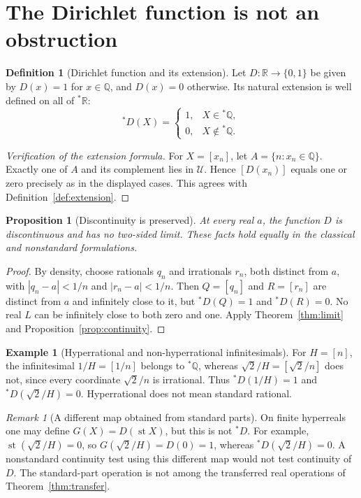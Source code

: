 \documentclass[11pt]{article}
\newtheorem{proposition}[theorem]{Proposition}
\theoremstyle{definition}
\newtheorem{definition}[theorem]{Definition}
\newtheorem{example}[theorem]{Example}
\theoremstyle{remark}
\newtheorem{remark}[theorem]{Remark}
\newcommand{\RR}{\mathbb R}
\newcommand{\QQ}{\mathbb Q}
\newcommand{\HR}{{}^{*}\mathbb R}
\newcommand{\ext}[1]{{}^{*}\!#1}
\newcommand{\U}{\mathcal U}
\DeclareMathOperator{\st}{st}
\begin{document}
\section{The Dirichlet function is not an obstruction}
\begin{definition}[Dirichlet function and its extension]\label{def:dirichlet}
Let \(D:\RR\to\{0,1\}\) be given by \(D(x)=1\) for \(x\in\QQ\), and
\(D(x)=0\) otherwise. Its natural extension is well defined on all of \(\HR\):
\[
\ext D(X)=
\begin{cases}1,&X\in\ext\QQ,\\0,&X\notin\ext\QQ.\end{cases}
\]
\end{definition}
\begin{proof}[Verification of the extension formula]
For \(X=[x_n]\), let \(A=\{n:x_n\in\QQ\}\). Exactly one of \(A\) and its
complement lies in \(\U\). Hence \([D(x_n)]\) equals one or zero precisely
as in the displayed cases. This agrees with Definition~\ref{def:extension}.
\end{proof}
\begin{proposition}[Discontinuity is preserved]\label{prop:dirichlet}
At every real \(a\), the function \(D\) is discontinuous and has no two-sided
limit. These facts hold equally in the classical and nonstandard formulations.
\end{proposition}
\begin{proof}
By density, choose rationals \(q_n\) and irrationals \(r_n\), both distinct
from \(a\), with \(|q_n-a|<1/n\) and \(|r_n-a|<1/n\).
Then \(Q=[q_n]\) and \(R=[r_n]\) are distinct from \(a\) and infinitely close
to it, but \(\ext D(Q)=1\) and \(\ext D(R)=0\).
No real \(L\) can be infinitely close to both zero and one. Apply
Theorem~\ref{thm:limit} and Proposition~\ref{prop:continuity}.
\end{proof}
\begin{example}[Hyperrational and non-hyperrational infinitesimals]\label{ex:hyperrational}
For \(H=[n]\), the infinitesimal \(1/H=[1/n]\) belongs to \(\ext\QQ\), whereas
\(\sqrt2/H=[\sqrt2/n]\) does not, since every coordinate \(\sqrt2/n\) is
irrational. Thus \(\ext D(1/H)=1\) and \(\ext D(\sqrt2/H)=0\).
Hyperrational does not mean standard rational.
\end{example}
\begin{remark}[A different map obtained from standard parts]\label{rem:wrong-extension}
On finite hyperreals one may define \(G(X)=D(\st X)\), but this is not
\(\ext D\). For example, \(\st(\sqrt2/H)=0\), so \(G(\sqrt2/H)=D(0)=1\),
whereas \(\ext D(\sqrt2/H)=0\).
A nonstandard continuity test using this different map would not test continuity
of \(D\). The standard-part operation is not among the transferred real
operations of Theorem~\ref{thm:transfer}.
\end{remark}
\end{document}
